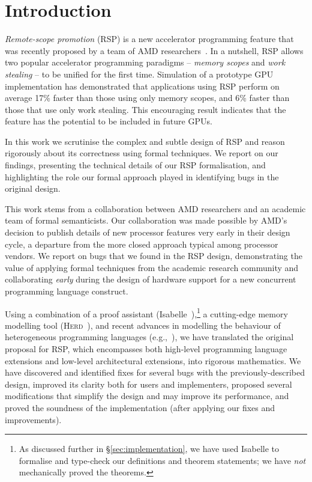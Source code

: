 \documentclass[svgnames,10pt]{sigplanconf}
\theoremstyle{definition}
\newcommand\herd{\textsc{Herd}}
\begin{document}
\section{Introduction}
\label{sec:intro}

\emph{Remote-scope promotion} (RSP) is a new accelerator programming
feature that was recently proposed by a team of AMD researchers~\cite{orr+15}. 
In a nutshell, RSP allows two
popular accelerator programming paradigms -- \emph{memory scopes} and
\emph{work stealing} -- to be unified for the first time. Simulation
of a prototype GPU implementation has demonstrated that applications
using RSP perform on average 17\% faster than those using only memory scopes, and
6\% faster than those that use only work stealing. This encouraging
result indicates that the feature has the potential to be included in
future GPUs.

In this work we scrutinise the
complex and subtle design of RSP and reason rigorously about its
correctness using formal techniques.
We report on our findings, presenting the technical details of our RSP
formalisation, and highlighting the role our formal approach played in
identifying bugs in the original design.

This work stems from a collaboration between AMD researchers and an
academic team of formal semanticists. Our collaboration was made
possible by AMD's decision to publish details of new processor
features very early in their design cycle, a departure from the more
closed approach typical among processor vendors.
We report on bugs that we found in the RSP design,
demonstrating the value of applying formal techniques from the academic
research community and collaborating \emph{early} during the design of hardware support
for a new concurrent programming language construct.

Using a combination of a proof assistant
(Isabelle~\cite{nipkow+02}),\footnote{As discussed further in
\S\ref{sec:implementation}, we have used Isabelle to formalise and
type-check our definitions and theorem statements; we have \emph{not}
mechanically proved the theorems.} a cutting-edge memory modelling
tool (\herd{}~\cite{alglave+14}), and recent advances in modelling the
behaviour of heterogeneous programming languages
(e.g.,~\cite{wickerson+15}), we have translated the original
proposal for RSP, which encompasses both high-level programming language
extensions and low-level architectural extensions, into rigorous
mathematics. We have discovered and 
identified fixes for several bugs with the
previously-described design,
improved its clarity both for users and implementers, proposed several
modifications that simplify the design and may improve its
performance, and proved the soundness of the implementation
(after applying our fixes and improvements).
\end{document}
